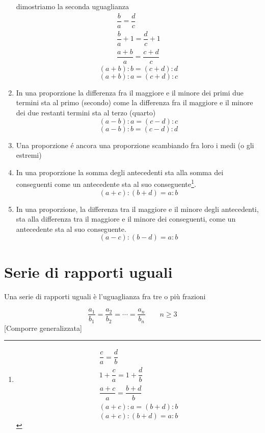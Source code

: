 \begin{enumerate}
{		dimostriamo la seconda uguaglianza
		\begin{gather*}
		\dfrac{b}{a}=\dfrac{d}{c}\\
		\dfrac{b}{a}+1=\dfrac{d}{c}+1\\
		\dfrac{a+b}{a}=\dfrac{c+d}{c}
		\end{gather*}}
	\[(a+b):b = (c+d):d\]
	\[(a+b):a = (c+d):c\]
	\item In una proporzione la differenza fra il maggiore e il minore dei primi due termini sta al primo (secondo) come la differenza fra il maggiore e il minore dei due restanti termini sta al terzo (quarto)
	\[(a-b):a = (c-d):c\]
	\[(a-b):b = (c-d):d\]
	\item Una proporzione \'{e} ancora una proporzione scambiando fra loro i medi (o gli estremi)
	\item In una proporzione la somma degli antecedenti sta alla somma dei conseguenti come un antecedente sta al suo conseguente\footnote{\begin{gather*}
		\dfrac{c}{a}=\dfrac{d}{b}
		\\1+\dfrac{c}{a}=1+\dfrac{d}{b}
		\\ \dfrac{a+c}{a}=\dfrac{b+d}{b}
		\\ (a+c):a= (b+d):b
		\end{gather*}
		\[(a+c):(b+d)=a:b\]}.
	\[(a+c):(b+d)=a:b\]
	\item In una proporzione, la differenza tra il maggiore e il minore degli antecedenti, sta alla differenza tra il maggiore e il minore dei conseguenti, come un antecedente sta al suo conseguente.
	\[(a-c):(b-d)=a:b\]
\end{enumerate}
\section{Serie di rapporti uguali}
\label{sec:serieDiRapportiUguali}

Una serie di rapporti uguali è l'uguaglianza fra tre o più frazioni\label{sec:sRaUguali}

\[
\dfrac{a_{1}}{b_{1}}=\dfrac{a_{2}}{b_{2}}=\cdots=\dfrac{a_{n}}{b_{n}}\qquad n\geq3\]
[Comporre generalizzata]

